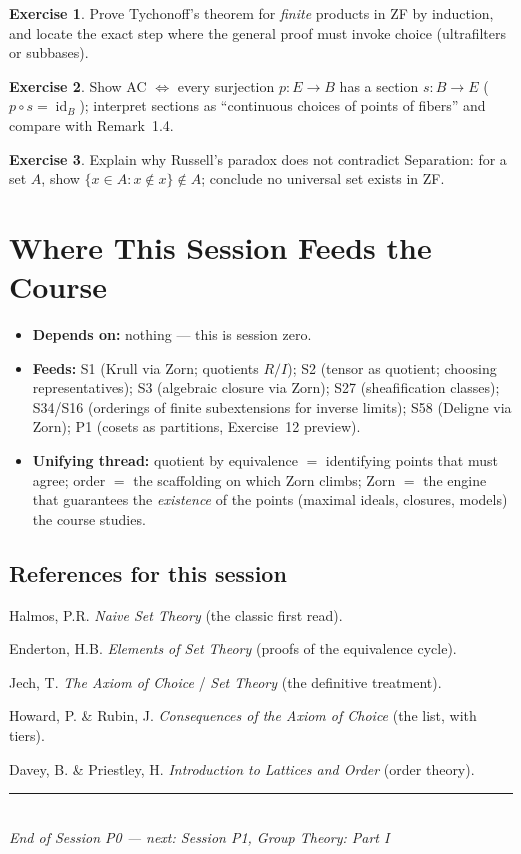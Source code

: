 \documentclass[11pt,a4paper]{article}
\theoremstyle{definition}
\newtheorem{exercise}{Exercise}
\newcommand{\id}{\operatorname{id}}
\begin{document}
\begin{exercise}
Prove Tychonoff's theorem for \emph{finite} products in ZF by induction, and locate the exact step
where the general proof must invoke choice (ultrafilters or subbases).
\end{exercise}
\begin{exercise}
Show AC $\iff$ every surjection $p:E\to B$ has a section $s:B\to E$ ($p\circ s=\id_B$); interpret
sections as ``continuous choices of points of fibers'' and compare with Remark~1.4.
\end{exercise}
\begin{exercise}
Explain why Russell's paradox does not contradict Separation: for a set $A$, show
$\{x\in A:x\notin x\}\notin A$; conclude no universal set exists in ZF.
\end{exercise}

\section*{Where This Session Feeds the Course}
\begin{itemize}
  \item \textbf{Depends on:} nothing --- this is session zero.
  \item \textbf{Feeds:} S1 (Krull via Zorn; quotients $R/I$); S2 (tensor as quotient; choosing
    representatives); S3 (algebraic closure via Zorn); S27 (sheafification classes); S34/S16
    (orderings of finite subextensions for inverse limits); S58 (Deligne via Zorn); P1 (cosets as
    partitions, Exercise~12 preview).
  \item \textbf{Unifying thread:} quotient by equivalence $=$ identifying points that must agree;
    order $=$ the scaffolding on which Zorn climbs; Zorn $=$ the engine that guarantees the
    \emph{existence} of the points (maximal ideals, closures, models) the course studies.
\end{itemize}

\subsection*{References for this session}
\begin{enumerate}[label={[\arabic*]}]
  \item Halmos, P.R. \emph{Naive Set Theory} (the classic first read).
  \item Enderton, H.B. \emph{Elements of Set Theory} (proofs of the equivalence cycle).
  \item Jech, T. \emph{The Axiom of Choice} / \emph{Set Theory} (the definitive treatment).
  \item Howard, P. \& Rubin, J. \emph{Consequences of the Axiom of Choice} (the list, with tiers).
  \item Davey, B. \& Priestley, H. \emph{Introduction to Lattices and Order} (order theory).
\end{enumerate}

\vspace{1.5em}
\begin{center}
\rule{0.6\textwidth}{0.4pt}\\[0.5em]
\textit{End of Session P0 --- next: Session P1, Group Theory: Part I}
\end{center}
\end{document}
